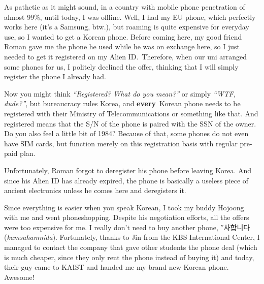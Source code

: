 \begin{post}
	\begin{content}
As pathetic as it might sound, in a country with mobile phone penetration of almost 99\%, until today, I was offline. Well, I had my EU phone, which perfectly works here (it's a Samsung, btw.), but roaming is quite expensive for everyday use, so I wanted to get a Korean phone. Before coming here, my good friend Roman gave me the phone he used while he was on exchange here, so I just needed to get it registered on my Alien ID. Therefore, when our uni arranged some phones for us, I politely declined the offer, thinking that I will simply register the phone I already had.

Now you might think \textit{``Registered? What do you mean?''} or simply \textit{``WTF, dude?''}, but bureaucracy rules Korea, and \textbf{every} Korean phone needs to be registered with their Ministry of Telecommunications or something like that. And registered means that the S/N of the phone is paired with the SSN of the owner. Do you also feel a little bit of 1984? Because of that, some phones do not even have SIM cards, but function merely on this registration basis with regular pre-paid plan.

Unfortunately, Roman forgot to deregister his phone before leaving Korea. And since his Alien ID has already expired, the phone is basically a useless piece of ancient electronics unless he comes here and deregisters it.

Since everything is easier when you speak Korean, I took my buddy Hojoong with me and went phoneshopping. Despite his negotiation efforts, all the offers were too expensive for me. I really don't need to buy another phone, {\H 감사합니다} (\textit{kamsahamnida}). Fortunately, thanks to Jin from the KBS International Center, I managed to contact the company that gave other students the phone deal (which is much cheaper, since they only rent the phone instead of buying it) and today, their guy came to KAIST and handed me my brand new Korean phone. Awesome!


\end{content}
\end{post}
